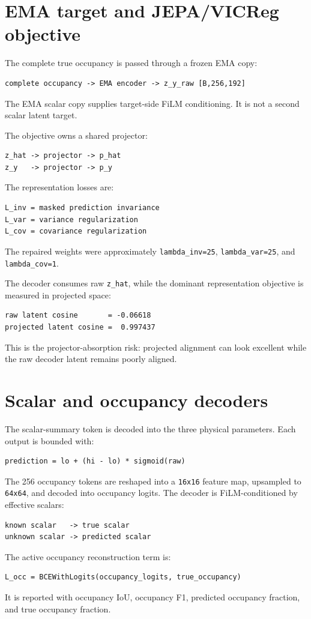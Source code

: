 \documentclass[11pt,a4paper]{article}
\begin{document}
\section{EMA target and JEPA/VICReg objective}
The complete true occupancy is passed through a frozen EMA copy:
\begin{lstlisting}
complete occupancy -> EMA encoder -> z_y_raw [B,256,192]
\end{lstlisting}
The EMA scalar copy supplies target-side FiLM conditioning. It is not a second
scalar latent target.

The objective owns a shared projector:
\begin{lstlisting}
z_hat -> projector -> p_hat
z_y   -> projector -> p_y
\end{lstlisting}
The representation losses are:
\begin{lstlisting}
L_inv = masked prediction invariance
L_var = variance regularization
L_cov = covariance regularization
\end{lstlisting}
The repaired weights were approximately \texttt{lambda\_inv=25},
\texttt{lambda\_var=25}, and \texttt{lambda\_cov=1}.

The decoder consumes raw \texttt{z\_hat}, while the dominant representation
objective is measured in projected space:
\begin{lstlisting}
raw latent cosine       = -0.06618
projected latent cosine =  0.997437
\end{lstlisting}
This is the projector-absorption risk: projected alignment can look excellent
while the raw decoder latent remains poorly aligned.

\section{Scalar and occupancy decoders}
The scalar-summary token is decoded into the three physical parameters. Each
output is bounded with:
\begin{lstlisting}
prediction = lo + (hi - lo) * sigmoid(raw)
\end{lstlisting}
The 256 occupancy tokens are reshaped into a \texttt{16x16} feature map,
upsampled to \texttt{64x64}, and decoded into occupancy logits. The decoder is
FiLM-conditioned by effective scalars:
\begin{lstlisting}
known scalar   -> true scalar
unknown scalar -> predicted scalar
\end{lstlisting}
The active occupancy reconstruction term is:
\begin{lstlisting}
L_occ = BCEWithLogits(occupancy_logits, true_occupancy)
\end{lstlisting}
It is reported with occupancy IoU, occupancy F1, predicted occupancy fraction,
and true occupancy fraction.
\end{document}
